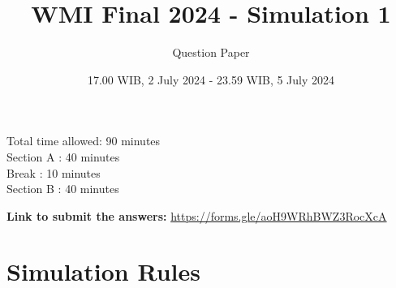 \documentclass[12pt]{scrartcl}
\title{WMI Final 2024 - Simulation 1}
\author{Question Paper}
\date{17.00 WIB, 2 July 2024 - 23.59 WIB, 5 July 2024}
\begin{document}
\maketitle
\begin{center}
    \Huge
\end{center}
\vspace{3cm}

\begin{flushleft}
\LARGE
   Total time allowed: 90 minutes\\
\large
   Section A : 40 minutes\\
   Break : 10 minutes\\
   Section B : 40 minutes
\end{flushleft}

\vspace{2cm}
\begin{flushleft}
    \Large
    \textbf{Link to submit the answers:} \url{https://forms.gle/aoH9WRhBWZ3RocXcA}
\end{flushleft}

\newpage
\section*{Simulation Rules}
\end{document}
